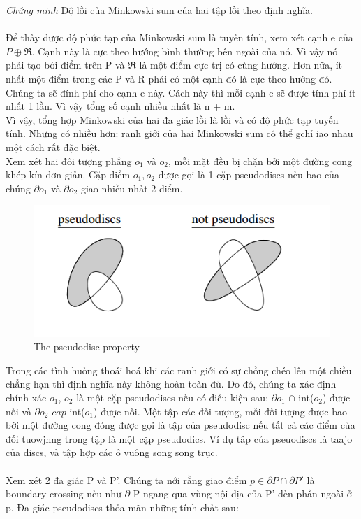\documentclass[a4paper,12pt]{report}
\begin{document}
\textit{Chứng minh} Độ lồi của Minkowski sum của hai tập lồi theo định nghĩa. \\ \\
Để thấy được độ phức tạp của Minkowski sum là tuyến tính, xem xét cạnh e của $P \oplus \Re$. Cạnh này là cực theo hướng bình thường bên ngoài của nó. Vì vậy nó phải tạo bới điểm trên P và $\Re$ là một điểm cực trị có cùng hướng. Hơn nữa, ít nhất một điểm trong các P và R phải có một cạnh đó là cực theo hướng đó. Chúng ta sẽ đính phí cho cạnh e này. Cách này thì mỗi cạnh e sẽ được tính phí ít nhất 1 lần. Vì vậy tổng số cạnh nhiều nhất là n + m. \\
Vì vậy, tổng hợp Minkowski của hai đa giác lồi là lồi và có độ phức tạp tuyến tính. Nhưng có nhiều hơn: ranh giới của hai Minkowski sum có thể gchỉ iao nhau một cách rất đặc biệt. \\
Xem xét hai đôi tượng phẳng $o_1$ và $o_2$, mỗi mặt đều bị chặn bởi một đường cong khép kín đơn giản. Cặp điểm $o_1, o_2$ được gọi là 1 cặp pseudodiscs nếu bao của chúng $\partial o_1$ và $\partial o_2$ giao nhiều nhất 2 điểm.\\
\begin{figure}[H]
\centering
\includegraphics[width=0.5\linewidth]{6.png}
\caption{The pseudodisc property}
\end{figure}
Trong các tình huống thoái hoá khi các ranh giới có sự chồng chéo lên một chiều chẳng hạn thì định nghĩa này không hoàn toàn đủ. Do đó, chúng ta xác định chính xác $o_1$, $o_2$ là một cặp pseudodiscs nếu có điều kiện sau: $\partial o_1$ $\cap$ int($o_2$) được nối và $\partial o_2$ $cap$ int($o_1$) được nối. Một tập các đối tượng, mỗi đối tượng được bao bới một đường cong đóng được gọi là tập của pseudodisc nếu tất cả các điểm của đối tuowjnng trong tập là một cặp pseudodics. Ví dụ tâp của pseuodiscs là taajo của discs, và tập hợp các ô vuông song song trục.\\  \\
Xem xét 2 đa giác P và P'. Chúng ta nới rằng giao điểm $p \in \partial P \cap \partial P'$ là boundary crossing nếu như $\partial $ P ngang qua vùng nội địa của P' đến phần ngoài ở p. Đa giác pseudodiscs thỏa mãn những tính chất sau:\\ \\
\end{document}
